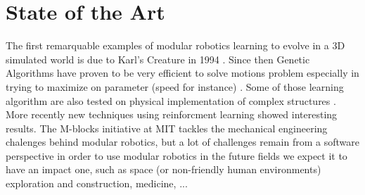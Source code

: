 
\chapter{State of the Art} %

\label{Chapter 1} %




The first remarquable examples of modular robotics learning to evolve in a 3D simulated world is due to Karl's Creature in 1994 \cite{karl}. Since then Genetic Algorithms have proven to be very efficient to solve motions problem especially in trying to maximize on parameter (speed for instance) \cite{marbach} \cite{heinen} \cite{schaffer}. Some of those learning algorithm are also tested on physical implementation of complex  structures \cite{aibo} \cite{schaffer}. More recently new techniques using reinforcment learning \cite{christensen} showed interesting results. The M-blocks initiative at MIT \cite{mitcubes} tackles the mechanical engineering chalenges behind modular robotics, but a lot of challenges remain from a software perspective in order to use modular robotics in the future fields we expect it to have an impact one, such as space (or non-friendly human environments) exploration and construction, medicine, ... 

